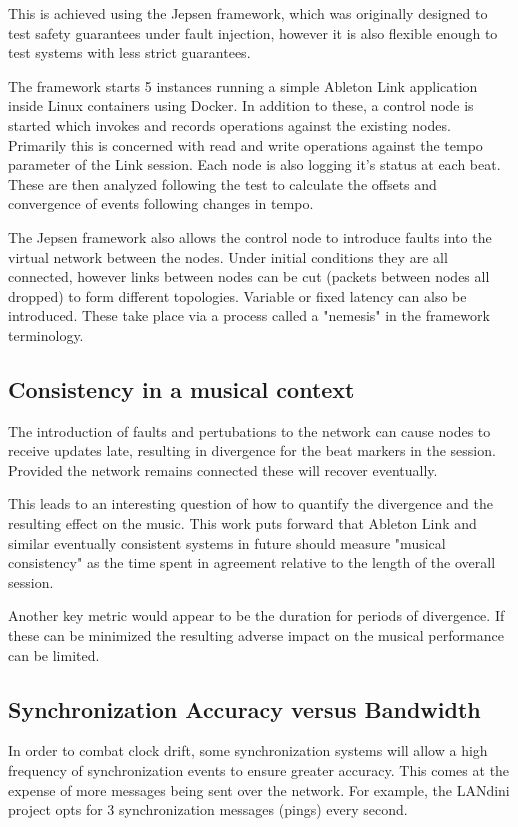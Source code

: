 \documentclass[11pt]{article} %
\theoremstyle{plain}
\theoremstyle{definition}
\begin{document}
This is achieved using the Jepsen framework\cite{jepsen}, which was
originally designed to test safety guarantees under fault injection, however it
is also flexible enough to test systems with less strict guarantees.

The framework starts 5 instances running a simple Ableton Link application
inside Linux containers using Docker. In addition to these, a control node is
started which invokes and records operations against the existing nodes.
Primarily this is concerned with read and write operations against the tempo
parameter of the Link session. Each node is also logging it's status at each
beat. These are then analyzed following the test to calculate the offsets and
convergence of events following changes in tempo.

The Jepsen framework also allows the control node to introduce faults into the
virtual network between the nodes. Under initial conditions they are all
connected, however links between nodes can be cut (packets between nodes all
dropped) to form different topologies. Variable or fixed latency can also be
introduced. These take place via a process called a "nemesis" in the framework
terminology.

\subsection{Consistency in a musical context}

The introduction of faults and pertubations to the network can cause nodes to
receive updates late, resulting in divergence for the beat markers in the
session. Provided the network remains connected these will recover eventually.

This leads to an interesting question of how to quantify the divergence and the
resulting effect on the music. This work puts forward that Ableton Link and
similar eventually consistent systems in future should measure "musical
consistency" as the time spent in agreement relative to the length of the
overall session.

Another key metric would appear to be the duration for periods of divergence.
If these can be minimized the resulting adverse impact on the musical
performance can be limited.

\subsection{Synchronization Accuracy versus Bandwidth}

In order to combat clock drift, some synchronization systems will allow a high
frequency of synchronization events to ensure greater accuracy. This comes at
the expense of more messages being sent over the network. For example, the
LANdini project opts for 3 synchronization messages (pings) every second.
\end{document}
